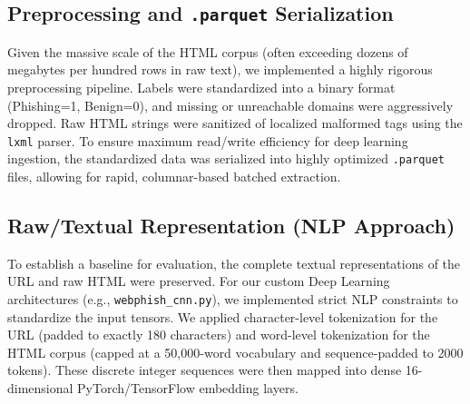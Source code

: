 \documentclass[conference]{IEEEtran}
\begin{document}
\subsection{Preprocessing and \texttt{.parquet} Serialization}
Given the massive scale of the HTML corpus (often exceeding dozens of megabytes per hundred rows in raw text), we implemented a highly rigorous preprocessing pipeline. Labels were standardized into a binary format (Phishing=1, Benign=0), and missing or unreachable domains were aggressively dropped. Raw HTML strings were sanitized of localized malformed tags using the \texttt{lxml} parser. To ensure maximum read/write efficiency for deep learning ingestion, the standardized data was serialized into highly optimized \texttt{.parquet} files, allowing for rapid, columnar-based batched extraction.

\subsection{Raw/Textual Representation (NLP Approach)}
To establish a baseline for evaluation, the complete textual representations of the URL and raw HTML were preserved. 
For our custom Deep Learning architectures (e.g., \texttt{webphish\_cnn.py}), we implemented strict NLP constraints to standardize the input tensors. We applied character-level tokenization for the URL (padded to exactly 180 characters) and word-level tokenization for the HTML corpus (capped at a 50,000-word vocabulary and sequence-padded to 2000 tokens). These discrete integer sequences were then mapped into dense 16-dimensional PyTorch/TensorFlow embedding layers.
\end{document}
